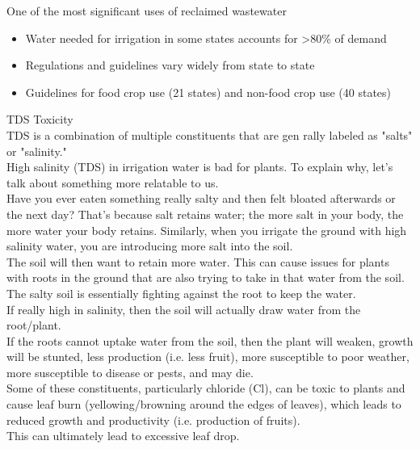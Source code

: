 \documentclass{article}
\begin{document}
One of the most significant uses of reclaimed wastewater
\begin{itemize}
\item Water needed for irrigation in some states accounts for >80\% of demand
\item Regulations and guidelines vary widely from state to state
\item Guidelines for food crop use (21 states) and non-food crop use (40 states)
 \end{itemize}
 
 
 
TDS Toxicity\\
TDS is a combination of multiple constituents that are gen  rally labeled as "salts" or "salinity."  \\
High salinity (TDS) in irrigation water is bad for plants.  To explain why, let's talk about something more relatable to us.  \\

Have you ever eaten something really salty and then felt bloated afterwards or the next day?  That's because salt retains water; the more salt in your body, the more water your body retains.  Similarly, when you irrigate the ground with high salinity water, you are introducing more salt into the soil.  \\

The soil will then want to retain more water.  This can cause issues for plants with roots in the ground that are also trying to take in that water from the soil.  The salty soil is essentially fighting against the root to keep the water.  \\

If really high in salinity, then the soil will actually draw water from the root/plant.\\  

If the roots cannot uptake water from the soil, then the plant will weaken, growth will be stunted, less production (i.e. less fruit), more susceptible to poor weather, more susceptible to disease or pests, and may die.\\
  
Some of these constituents, particularly chloride (Cl), can be toxic to plants and cause leaf burn (yellowing/browning around the edges of leaves), which leads to reduced growth and productivity (i.e. production of fruits). \\

This can ultimately lead to excessive leaf drop.\\
\end{document}
